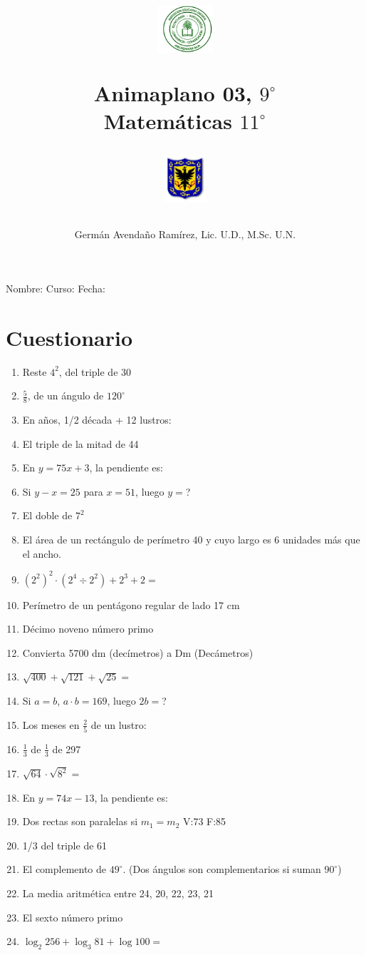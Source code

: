 \documentclass[11pt,twoside,letter]{article}
\author{Germ\'an Avenda\~no Ram\'irez, Lic. U.D., M.Sc. U.N.}
\title{\begin{minipage}{.2\textwidth}
\includegraphics[height=1.75cm]{Images/logo-colegio.png}\end{minipage}
\begin{minipage}{.55\textwidth}
\begin{center}
Animaplano 03, $9^{\circ}$  \\
Matemáticas $11^{\circ}$
\end{center}
\end{minipage}\hfill
\begin{minipage}{.2\textwidth}
\includegraphics[height=1.75cm]{Images/logo-sed.png} 
\end{minipage}}
\date{}
\begin{document}
\maketitle
Nombre: \hrulefill Curso: \underline{\hspace*{44pt}} Fecha: \underline{\hspace*{2.5cm}}
\section*{Cuestionario}
\begin{enumerate}
 \item Reste $4^{2}$, del triple de 30
 \item $\frac{5}{8}$, de un ángulo de $120^{\circ}$
 \item En años, 1/2 década + 12 lustros:
 \item El triple de la mitad de 44
 \item En $y=75x+3$, la pendiente es:
 \item Si $y-x=25$ para $x=51$, luego $y=$?
 \item El doble de $7^{2}$
 \item El área de un rectángulo de perímetro 40 y cuyo largo es 6 unidades más que el ancho.
 \item $(2^{2})^{2}\cdot (2^{4}\div 2^{2})+2^{3}+2=$
 \item Perímetro de un pentágono regular de lado 17 cm
 \item Décimo noveno número primo
 \item Convierta 5700 dm (decímetros) a Dm (Decámetros)
 \item $\sqrt{400}+\sqrt{121}+\sqrt{25}=$
 \item Si $a=b$, $a\cdot b=169$, luego $2b=$?
 \item Los meses en $\frac{2}{5}$ de un lustro:
 \item $\frac{1}{3}$ de $\frac{1}{3}$ de 297
 \item $\sqrt{64}\cdot \sqrt{8^{2}}=$
 \item En $y=74x-13$, la pendiente es:
 \item Dos rectas son paralelas si $m_{1}=m_{2}$ V:73 \quad F:85
 \item 1/3 del triple de 61
 \item El complemento de $49^{\circ}$. (Dos ángulos son complementarios si suman $90^{\circ}$)
 \item La media aritmética entre 24, 20, 22, 23, 21
 \item El sexto número primo
 \item $\log_{2}256+\log_{3}81+\log100=$

\end{enumerate}
\end{document}
